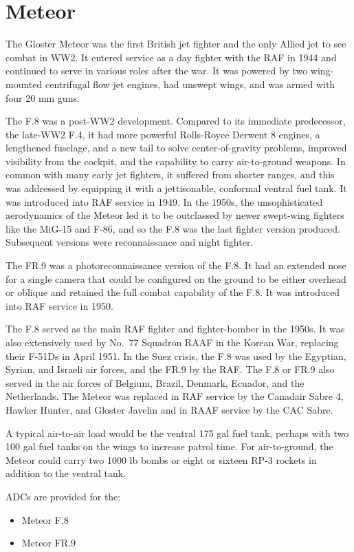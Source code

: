 \section*{Meteor}

The Gloster Meteor was the first British jet fighter and the only Allied jet to see combat in WW2. It entered service as a day fighter with the RAF in 1944 and continued to serve in various roles after the war. It was powered by two wing-mounted centrifugal flow jet engines, had unswept wings, and was armed with four 20 mm guns.

The F.8 was a post-WW2 development. Compared to its immediate predecessor, the late-WW2 F.4, it had more powerful Rolls-Royce Derwent 8 engines, a lengthened fuselage, and a new tail to solve center-of-gravity problems, improved visibility from the cockpit, and the capability to carry air-to-ground weapons. In common with many early jet fighters, it suffered from shorter ranges, and this was addressed by equipping it with a jettisonable, conformal ventral fuel tank. It was introduced into RAF service in 1949. In the 1950s, the unsophisticated aerodynamics of the Meteor led it to be outclassed by newer swept-wing fighters like the MiG-15 and F-86, and so the F.8 was the last fighter version produced. Subsequent versions were reconnaissance and night fighter.
 
The FR.9 was a photoreconnaissance version of the F.8. It had an extended nose for a single camera that could be configured on the ground to be either overhead or oblique and retained the full combat capability of the F.8. It was introduced into RAF service in 1950.

The F.8 served as the main RAF fighter and fighter-bomber in the 1950s. It was also extensively used by No.~77 Squadron RAAF in the Korean War, replacing their F-51Ds in April 1951. In the Suez crisis, the F.8 was used by the Egyptian, Syrian, and Israeli air forces, and the FR.9 by the RAF. The F.8 or FR.9 also served in the air forces of Belgium, Brazil, Denmark, Ecuador, and the Netherlands. The Meteor was replaced in RAF service by the Canadair Sabre 4, Hawker Hunter, and Gloster Javelin and in RAAF service by the CAC Sabre.


A typical air-to-air load would be the ventral 175 gal fuel tank, perhaps with two 100 gal fuel tanks on the wings to increase patrol time. For air-to-ground, the Meteor could carry two 1000 lb bombs or eight or sixteen RP-3 rockets in addition to the ventral tank.

ADCs are provided for the:
\begin{itemize}
\item Meteor F.8
\item Meteor FR.9
\end{itemize}
